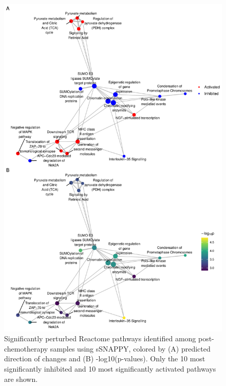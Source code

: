 \documentclass[9pt,a4paper,]{extarticle}
\begin{document}
\begin{figure}

{\centering \includegraphics[width=1\linewidth]{sSNAPPY_paper_files/figure-latex/Figure4-1} 

}

\caption{Significantly perturbed Reactome pathways identified among post-chemotherapy samples using sSNAPPY, colored by (A) predicted direction of changes and (B) -log10(p-values). Only the 10 most significantly inhibited and 10 most significantly activated pathways are shown.}\label{fig:Figure4}
\end{figure}
\end{document}
